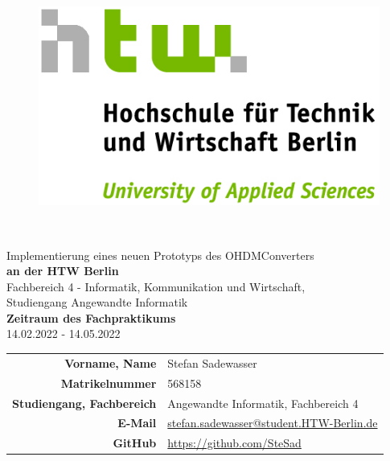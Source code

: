 \pagestyle{empty}
\clearmainofpairofpagestyles
\begin{figure}
	\centering
	\includegraphics{img/htw_logo.jpg}
	\vspace{60pt}
\end{figure}
\begin{center}
	\huge{\printTitle}\\
	\begin{large}
		Implementierung eines neuen Prototyps des OHDMConverters\\[1cm]
		\textbf{an der HTW Berlin}\\[0.4cm]
		Fachbereich 4 - Informatik, Kommunikation und Wirtschaft,\\
		Studiengang Angewandte Informatik\\[4cm]
		\textbf{Zeitraum des Fachpraktikums}\\
		14.02.2022 - 14.05.2022\\[1.5cm]
	\end{large}
	
	\begin{normalsize}
		\begin{tabularx}{\linewidth}{R X}
			\textbf{Vorname, Name} & Stefan Sadewasser\\
			\textbf{Matrikelnummer} & 568158\\
			\textbf{Studiengang, Fachbereich} & Angewandte Informatik, Fachbereich 4\\
			\textbf{E-Mail} & \href{mailto:stefan.sadewasser@student.HTW-Berlin.de}{stefan.sadewasser@student.HTW-Berlin.de}\\
			\textbf{GitHub} & \url{https://github.com/SteSad}
		\end{tabularx}
	\end{normalsize}\vspace{1cm}
\end{center} 
\newpage

